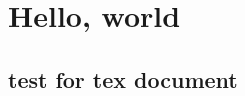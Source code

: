 \documentclass[a4paper,12pt]{article}
\begin{document}
\section{Hello, world}
\subsection{test for tex document}
\end{document}
